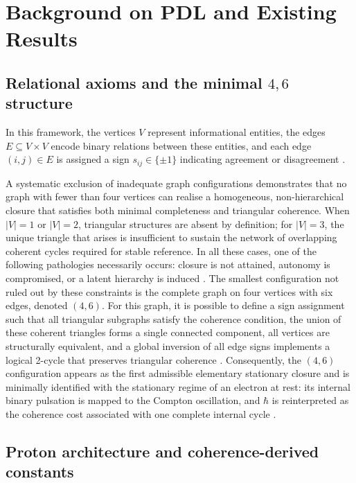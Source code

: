 \documentclass[11pt,a4paper]{article}
\theoremstyle{definition}
\begin{document}
\section{Background on PDL and Existing Results}\label{sec:background}

\subsection{Relational axioms and the minimal \texorpdfstring{$4,6$}{4,6} structure}

In this framework, the vertices $V$ represent informational entities, the edges $E \subseteq V \times V$ encode binary relations between these entities, and each edge $(i,j)\in E$ is assigned a sign $s_{ij}\in\{\pm 1\}$ indicating agreement or disagreement \cite{PDL,zenodo18462686}.

A systematic exclusion of inadequate graph configurations demonstrates that no graph with fewer than four vertices can realise a homogeneous, non-hierarchical closure that satisfies both minimal completeness and triangular coherence. When $|V|=1$ or $|V|=2$, triangular structures are absent by definition; for $|V|=3$, the unique triangle that arises is insufficient to sustain the network of overlapping coherent cycles required for stable reference. In all these cases, one of the following pathologies necessarily occurs: closure is not attained, autonomy is compromised, or a latent hierarchy is induced \cite{PDL}. The smallest configuration not ruled out by these constraints is the complete graph on four vertices with six edges, denoted $(4,6)$. For this graph, it is possible to define a sign assignment such that all triangular subgraphs satisfy the coherence condition, the union of these coherent triangles forms a single connected component, all vertices are structurally equivalent, and a global inversion of all edge signs implements a logical 2-cycle that preserves triangular coherence \cite{PDL,PDL_introduction,PDL_Global_Mapping_Structures_Results_Open_Problems}. Consequently, the $(4,6)$ configuration appears as the first admissible elementary stationary closure and is minimally identified with the stationary regime of an electron at rest: its internal binary pulsation is mapped to the Compton oscillation, and $\hbar$ is reinterpreted as the coherence cost associated with one complete internal cycle \cite{PDL,PDL_introduction}.

\subsection{Proton architecture and coherence-derived constants}
\end{document}
